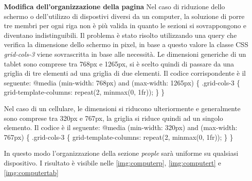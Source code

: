 \documentclass[target=bach,aauheader=]{thud}
\begin{document}
\textbf{{\fontsize{12}{14}\selectfont Modifica dell'organizzazione della pagina}}
\newline \newline
Nel caso di riduzione dello schermo o dell'utilizzo di dispostivi diversi da un computer, la soluzione di porre tre membri per ogni riga non è più valida in quanto le sezioni si sovrappongono e diventano indistinguibili.
Il problema è stato risolto utilizzando una query che verifica la dimensione dello schermo in pixel, in base a questo valore la classe CSS \textit{grid-cols-3} viene sovrascritta in base alle necessità.
\newline  
Le dimensioni generiche di un tablet sono comprese tra 768px e 1265px, si è scelto quindi di passare da una griglia di tre elementi ad una griglia di due elementi. Il codice corrispondente è il seguente:
\newline \newline
@media (min-width: 768px) and (max-width: 1265px) \{
\newline .grid-cols-3 \{
    \newline grid-template-columns: repeat(2, minmax(0, 1fr));
\newline
\}
\}
\newline \newline 


Nel caso di un cellulare, le dimensioni si riducono ulteriormente e generalmente sono comprese tra 320px e 767px, la griglia si riduce quindi ad un singolo elemento. Il codice è il seguente:
\newline \newline
@media (min-width: 320px) and (max-width: 767px) \{
\newline .grid-cols-3 \{
    \newline grid-template-columns: repeat(2, minmax(0, 1fr));
\newline
\}
\}
\newline \newline

In questo modo l'organizzazione della sezione \textit{people} sarà uniforme su qualsiasi dispositivo. I risultato è visibile nelle \cref{img:computerp}, \cref{img:computert} e \cref{img:computertab}
\end{document}
